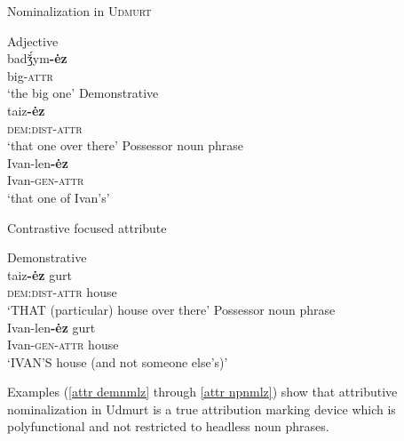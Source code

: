\begin{exe}
\ex \rm{Nominalization in \textsc{Udmurt} \citep{winkler2001}}
\begin{xlist}
\ex \rm{Adjective}\\
\gll	badǯ́ym\textbf{-ėz}\\
	big-\textsc{attr}\\
\glt	 ‘the big one’
\ex \rm{Demonstrative}\\
\gll	taiz\textbf{-ėz}\\
 	\textsc{dem:dist}-\textsc{attr}\\
\glt	‘that one over there’
\ex \rm{Possessor noun phrase}\\
\gll	Ivan-len\textbf{-ėz}\\
	Ivan-\textsc{gen}-\textsc{attr}\\
\glt	‘that one of Ivan's’
\end{xlist}
\ex \rm{Contrastive focused attribute}
\begin{xlist}
\label{attr demnmlz}
\ex \rm{Demonstrative}\\ 
\gll	taiz\textbf{-ėz} gurt\\
 	\textsc{dem:dist}-\textsc{attr} house\\
\glt	‘THAT (particular) house over there’
\label{attr npnmlz}
\ex \rm{Possessor noun phrase}\\ 
\gll	Ivan-len\textbf{-ėz} gurt\\
	Ivan-\textsc{gen}-\textsc{attr} house\\
\glt	‘IVAN'S house (and not someone else's)’
\end{xlist}
\end{exe}
Examples (\ref{attr demnmlz} through \ref{attr npnmlz}) show that attributive nominalization in Udmurt is a true attribution marking device which is polyfunctional and not restricted to headless noun phrases.

